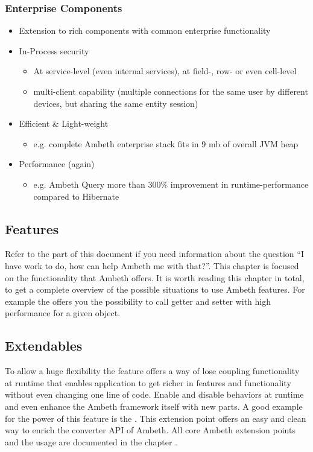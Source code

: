 \subsubsection{Enterprise Components}
\begin{itemize}
	\item Extension to rich components with common enterprise functionality
	\item In-Process security
	\begin{itemize}
		\item At service-level (even internal services), at field-, row- or even cell-level
		\item multi-client capability (multiple connections for the same user by different devices, but sharing the same entity session)
	\end{itemize}
	\item Efficient \& Light-weight
	\begin{itemize}
		\item e.g. complete Ambeth enterprise stack fits in 9 mb of overall JVM heap
	\end{itemize}
	\item Performance (again)
	\begin{itemize}
		\item e.g. Ambeth Query more than 300\% improvement in runtime-performance compared to Hibernate
	\end{itemize}
\end{itemize}



\subsection{Features}
Refer to the  part of this document if you need information about the question ``I have work to do, how can help Ambeth me with that?''. This 
chapter is focused on the functionality that Ambeth offers. It is worth reading this chapter in total, to get a complete overview of the possible situations to use Ambeth features. For example the  offers you the possibility to call getter and setter with high performance for a given object.

\subsection{Extendables}
To allow a huge flexibility the feature  offers a way of lose coupling functionality at runtime that enables application to get richer in features and functionality without even changing one line of code. Enable and disable behaviors at runtime and even enhance the Ambeth framework itself with new parts. A good example for the power of this feature is the . This extension point offers an easy and clean way to enrich the converter API of Ambeth. All core Ambeth extension points and the usage are documented in the chapter .

